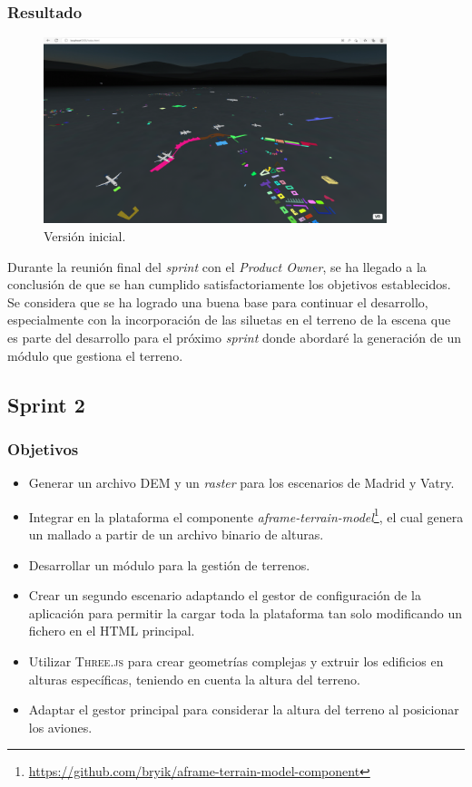 \documentclass[a4paper, 11pt]{book}
\begin{document}
\subsubsection{Resultado}
\begin{figure}[h]
  \centering
  \includegraphics[width=10cm, keepaspectratio]{img/Sprint1.png}
  \caption{Versión inicial.}
  \label{fig:sprint1}
\end{figure}
Durante la reunión final del \emph{sprint} con el \emph{Product Owner}, se ha llegado a la conclusión de que se han cumplido satisfactoriamente los objetivos establecidos. Se considera que se ha logrado una buena base para continuar el desarrollo, especialmente con la incorporación de las siluetas en el terreno de la escena que es parte del desarrollo para el próximo \emph{sprint} donde abordaré la generación de un módulo que gestiona el terreno.
\subsection{Sprint 2}
\subsubsection{Objetivos}
\begin{itemize}
    \item Generar un archivo \textsc{DEM} y un \emph{\gls{raster}} para los escenarios de Madrid y Vatry.
    \item Integrar en la plataforma el componente \emph{aframe-terrain-model}\footnote{\url{https://github.com/bryik/aframe-terrain-model-component}}, el cual genera un mallado a partir de un archivo binario de alturas.
    \item Desarrollar un módulo para la gestión de terrenos.
    \item Crear un segundo escenario adaptando el gestor de configuración de la aplicación para permitir la cargar toda la plataforma tan solo modificando un fichero en el \textsc{HTML} principal.
    \item Utilizar \textsc{Three.js} para crear geometrías complejas y extruir los edificios en alturas específicas, teniendo en cuenta la altura del terreno.
    \item Adaptar el gestor principal para considerar la altura del terreno al posicionar los aviones.
\end{itemize}
\end{document}
